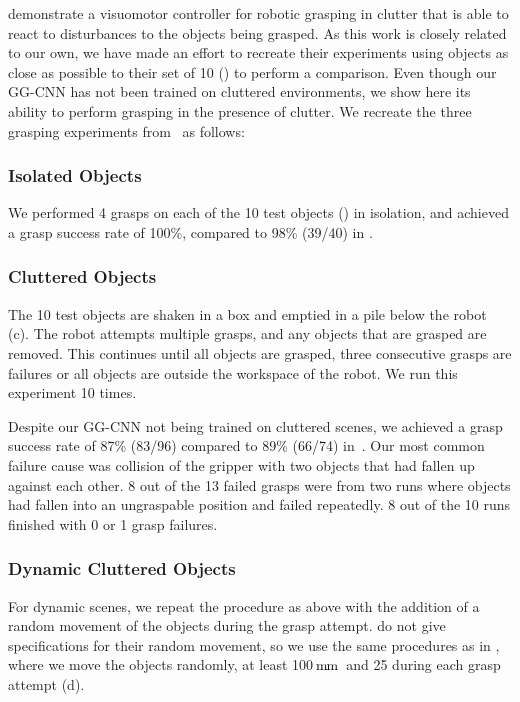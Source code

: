 \documentclass[conference]{IEEEtran}
\newcommand{\pack}	{\hspace{-0.08em}}
\newcommand{\mm}	{\ensuremath{\rm\,m\pack m}}
\begin{document}
\citet{Viereck2017LearningImages} demonstrate a visuomotor controller for robotic grasping in clutter that is able to react to disturbances to the objects being grasped.  As this work is closely related to our own, we have made an effort to recreate their experiments using objects as close as possible to their set of 10 () to perform a comparison.  Even though our GG-CNN has not been trained on cluttered environments, we show here its ability to perform grasping in the presence of clutter.  We recreate the three grasping experiments from~\cite{Viereck2017LearningImages} as follows:

\subsubsection{Isolated Objects}

We performed 4 grasps on each of the 10 test objects () in isolation, and achieved a grasp success rate of 100\%, compared to 98\% (39/40) in \cite{Viereck2017LearningImages}.

\subsubsection{Cluttered Objects}

The 10 test objects are shaken in a box and emptied in a pile below the robot (c).  The robot attempts multiple grasps, and any objects that are grasped are removed.  This continues until all objects are grasped, three consecutive grasps are failures or all objects are outside the workspace of the robot.  We run this experiment 10 times.

Despite our GG-CNN not being trained on cluttered scenes, we achieved a grasp success rate of 87\% (83/96) compared to 89\% (66/74) in~\cite{Viereck2017LearningImages}.  Our most common failure cause was collision of the gripper with two objects that had fallen up against each other.  8 out of the 13 failed grasps were from two runs where objects had fallen into an ungraspable position and failed repeatedly.  8 out of the 10 runs finished with 0 or 1 grasp failures.

\subsubsection{Dynamic Cluttered Objects}

For dynamic scenes, we repeat the procedure as above with the addition of a random movement of the objects during the grasp attempt.  \citet{Viereck2017LearningImages} do not give specifications for their random movement, so we use the same procedures as in , where we move the objects randomly, at least 100\mm~and 25 during each grasp attempt (d).
\end{document}
